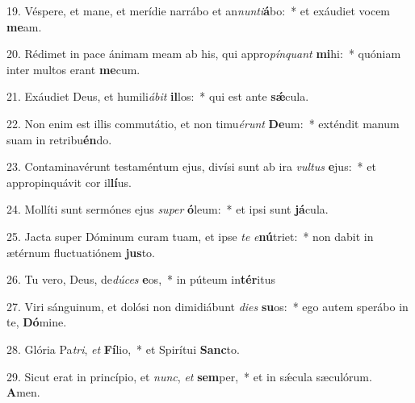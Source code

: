 19. Véspere, et mane, et merídie narrábo et an\textit{nun}\textit{ti}\textbf{á}bo:~*  et exáudiet vocem \textbf{me}am.\

20. Rédimet in pace ánimam meam ab his, qui appro\textit{pín}\textit{quant} \textbf{mi}hi:~*  quóniam inter multos erant \textbf{me}cum.\

21. Exáudiet Deus, et humili\textit{á}\textit{bit} \textbf{il}los:~*  qui est ante \textbf{sǽ}cula.\

22. Non enim est illis commutátio, et non timu\textit{é}\textit{runt} \textbf{De}um:~*  exténdit manum suam in retribu\textbf{én}do.\

23. Contaminavérunt testaméntum ejus, divísi sunt ab ira \textit{vul}\textit{tus} \textbf{e}jus:~*  et appropinquávit cor il\textbf{lí}us.\

24. Mollíti sunt sermónes ejus \textit{su}\textit{per} \textbf{ó}leum:~*  et ipsi sunt \textbf{já}cula.\

25. Jacta super Dóminum curam tuam, et ipse \textit{te} \textit{e}\textbf{nú}triet:~*  non dabit in ætérnum fluctuatiónem \textbf{jus}to.\

26. Tu vero, Deus, de\textit{dú}\textit{ces} \textbf{e}os,~*  in púteum in\textbf{tér}itus\

27. Viri sánguinum, et dolósi non dimidiábunt \textit{di}\textit{es} \textbf{su}os:~*  ego autem sperábo in te, \textbf{Dó}mine.\

28. Glória Pa\textit{tri}, \textit{et} \textbf{Fí}lio,~*  et Spirítui \textbf{Sanc}to.\

29. Sicut erat in princípio, et \textit{nunc}, \textit{et} \textbf{sem}per,~*  et in sǽcula sæculórum. \textbf{A}men.\

